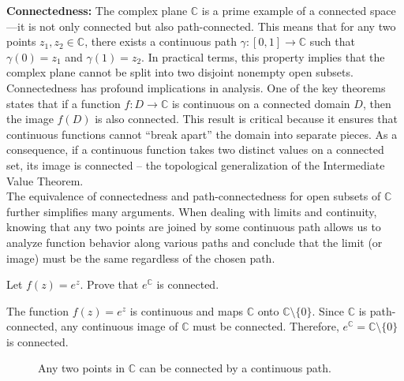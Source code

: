 \noindent \textbf{Connectedness:}  The complex plane \(\mathbb{C}\) is a prime example of a connected space—it is not only connected but also path-connected. This means that for any two points \(z_1, z_2 \in \mathbb{C}\), there exists a continuous path \(\gamma: [0,1] \to \mathbb{C}\) such that \(\gamma(0)=z_1\) and \(\gamma(1)=z_2\). In practical terms, this property implies that the complex plane cannot be split into two disjoint nonempty open subsets.  \\

\noindent Connectedness has profound implications in analysis. One of the key theorems states that if a function \(f: D \to \mathbb{C}\) is continuous on a connected domain \(D\), then the image \(f(D)\) is also connected. This result is critical because it ensures that continuous functions cannot “break apart” the domain into separate pieces. As a consequence, if a continuous function takes two distinct values on a connected set, its image is connected -- the topological generalization of the Intermediate Value Theorem. \\

\noindent The equivalence of connectedness and path-connectedness for open subsets of \(\mathbb{C}\) further simplifies many arguments. When dealing with limits and continuity, knowing that any two points are joined by some continuous path allows us to analyze function behavior along various paths and conclude that the limit (or image) must be the same regardless of the chosen path.


\begin{example}
Let \(f(z) = e^z\). Prove that \(e^{\mathbb{C}}\) is connected.
\begin{solution}
The function \(f(z)=e^z\) is continuous and maps \(\mathbb{C}\) onto \(\mathbb{C}\setminus\{0\}\). Since \(\mathbb{C}\) is path-connected, any continuous image of \(\mathbb{C}\) must be connected. Therefore, \(e^{\mathbb{C}} = \mathbb{C}\setminus\{0\}\) is connected.
\end{solution}
\end{example}

\begin{figure}[H]
\centering
{}
\caption{Any two points in \(\mathbb{C}\) can be connected by a continuous path.}
\label{fig:connected-path}
\end{figure}

